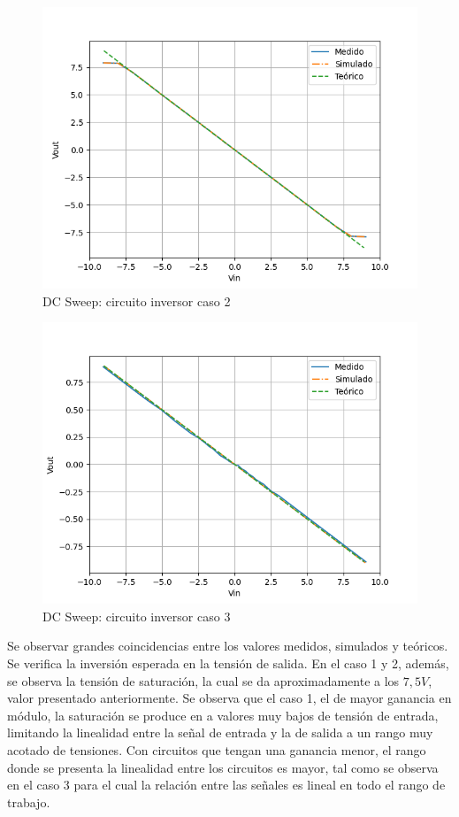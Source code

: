 \begin{figure}[H]
	\centering
	\includegraphics[scale=0.5]{./Imagenes/InvCaso2DC.png}
	\caption{DC Sweep: circuito inversor caso 2}
	\label{fig:circinvcaso1}
\end{figure}

\begin{figure}[H]
	\centering
	\includegraphics[scale=0.5]{./Imagenes/InvCaso3DC.png}
	\caption{DC Sweep: circuito inversor caso 3}
	\label{fig:circinvcaso1}
\end{figure}

Se observar grandes coincidencias entre los valores medidos, simulados y teóricos. Se verifica la inversión esperada en la tensión de salida. En el caso 1 y 2, además, se observa la tensión de saturación, la cual se da aproximadamente a los $7,5V$, valor presentado anteriormente. Se observa que el caso 1, el de mayor ganancia en módulo, la saturación se produce en a valores muy bajos de tensión de entrada, limitando la linealidad entre la señal de entrada y la de salida a un rango muy acotado de tensiones. Con circuitos que tengan una ganancia menor, el rango donde se presenta la linealidad entre los circuitos es mayor, tal como se observa en el caso 3 para el cual la relación entre las señales es lineal en todo el rango de trabajo. 

